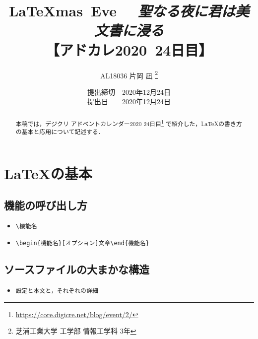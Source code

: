 \documentclass[a4paper]{jsarticle}
\title{
\vspace{-1cm} %
\LaTeX mas\ Eve~ ~{\it 聖なる夜に君は美文書に浸る} \\
【アドカレ2020~24日目】}
\author{AL18036 片岡 凪 \thanks{芝浦工業大学 工学部 情報工学科 3年}}
\date{提出締切　2020年12月24日 \\
提出日　　2020年12月24日}
\begin{document}

\maketitle


\setcounter{tocdepth}{2}
\tableofcontents
\newpage


\begin{abstract}
本稿では，デジクリ アドベントカレンダー2020 24日目\footnote{\url{https://core.digicre.net/blog/event/2/}} で紹介した，LaTeXの書き方の基本と応用について記述する．
\end{abstract}


\section{LaTeXの基本}


\subsection{機能の呼び出し方}
\begin{itemize}
\item \verb|\機能名|
\item \verb|\begin{機能名}[オプション]文章\end{機能名}|
\end{itemize}


\subsection{ソースファイルの大まかな構造}
\begin{itemize}
\item \verb|設定と本文と，それぞれの詳細|
\end{itemize}
\end{document}
